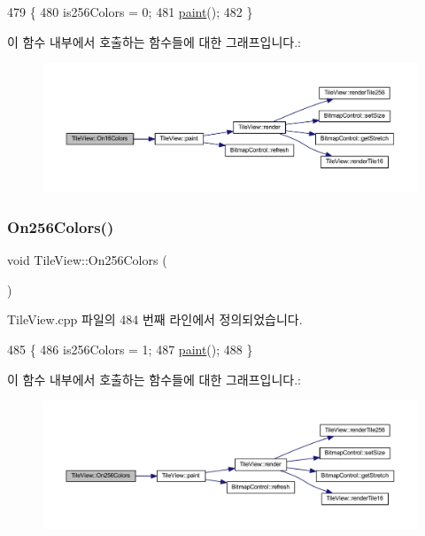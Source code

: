 \begin{DoxyCode}
479 \{
480   is256Colors = 0;
481   \mbox{\hyperlink{class_tile_view_a4341071a0cab0d5a8b6dfa7318230636}{paint}}();
482 \}
\end{DoxyCode}
이 함수 내부에서 호출하는 함수들에 대한 그래프입니다.\+:
\nopagebreak
\begin{figure}[H]
\begin{center}
\leavevmode
\includegraphics[width=350pt]{class_tile_view_a482139c5bc655015ba0700db5c04ec91_cgraph}
\end{center}
\end{figure}
\mbox{\label{class_tile_view_a021f1139dccc2ec023a315ed1f4619e1}} 
\subsubsection{\texorpdfstring{On256\+Colors()}{On256Colors()}}
{\footnotesize\ttfamily void Tile\+View\+::\+On256\+Colors (\begin{DoxyParamCaption}{ }\end{DoxyParamCaption})\hspace{0.3cm}{\ttfamily [protected]}}



Tile\+View.\+cpp 파일의 484 번째 라인에서 정의되었습니다.


\begin{DoxyCode}
485 \{
486   is256Colors = 1;
487   \mbox{\hyperlink{class_tile_view_a4341071a0cab0d5a8b6dfa7318230636}{paint}}();
488 \}
\end{DoxyCode}
이 함수 내부에서 호출하는 함수들에 대한 그래프입니다.\+:
\nopagebreak
\begin{figure}[H]
\begin{center}
\leavevmode
\includegraphics[width=350pt]{class_tile_view_a021f1139dccc2ec023a315ed1f4619e1_cgraph}
\end{center}
\end{figure}
\mbox{\label{class_tile_view_ab51dcedc72c43cf57133d4adcd264c10}} 
